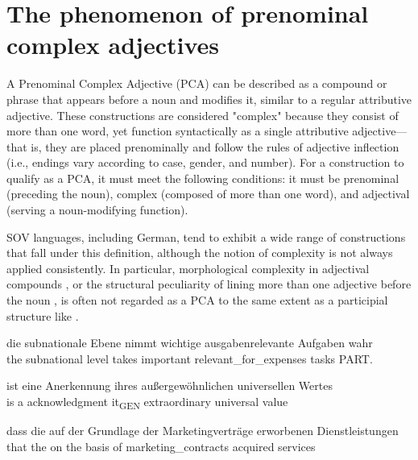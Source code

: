 \documentclass[output=paper,colorlinks,citecolor=brown]{langscibook}
\begin{document}
\section{The phenomenon of prenominal complex adjectives}\label{sec:resi:2}

A Prenominal Complex Adjective (PCA) can be described as a compound or phrase that appears before a noun and modifies it, similar to a regular attributive adjective. These constructions are considered "complex" because they consist of more than one word, yet function syntactically as a single attributive adjective—that is, they are placed prenominally and follow the rules of adjective inflection (i.e., endings vary according to case, gender, and number). For a construction to qualify as a PCA, it must meet the following conditions: it must be prenominal (preceding the noun), complex (composed of more than one word), and adjectival (serving a noun-modifying function).

SOV languages, including German, tend to exhibit a wide range of constructions that fall under this definition, although the notion of complexity is not always applied consistently. In particular, morphological complexity in adjectival compounds , or the structural peculiarity of lining more than one adjective before the noun , is often not regarded as a PCA to the same extent as a participial structure like .

\ea%
    \label{ex:resi:1}
\gll die  subnationale  Ebene  nimmt  wichtige  ausgabenrelevante        Aufgaben  wahr \\
      the  subnational  level  takes  important  relevant\_for\_expenses  tasks PART.    \\
\z


\ea%
    \label{ex:resi:2}
\gll ist  eine  Anerkennung  ihres  außergewöhnlichen  universellen  Wertes \\
     is  a  acknowledgment  it\textsubscript{GEN} extraordinary  universal  value  \\
\z

\ea%
    \label{ex:resi:3}
\gll dass  die  auf  der  Grundlage  der  Marketingverträge  erworbenen  Dienstleistungen \\
     that  the  on  the  basis      of  marketing\_contracts  acquired  services  \\

\z
\end{document}
